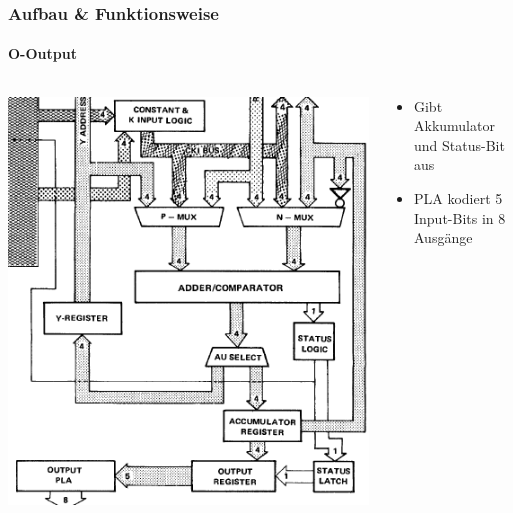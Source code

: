 \begin{frame}
\frametitle{Aufbau \& Funktionsweise}
	\framesubtitle{O-Output}
		\begin{columns}
			\begin{column}{5cm}
				\includegraphics[scale=0.25]{images/ALU.PNG}
			\end{column}
			\begin{column}{5cm}
				\begin{itemize}
					\item Gibt Akkumulator und Status-Bit aus \pause
					\item PLA kodiert 5 Input-Bits in 8 Ausg{\"a}nge
				\end{itemize}
			\end{column}
		\end{columns}
\end{frame}

